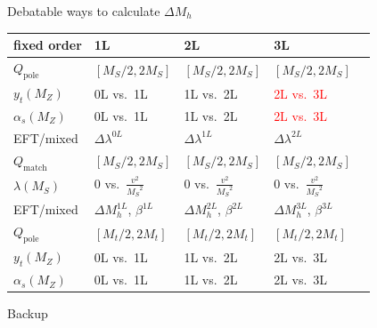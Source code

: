 \documentclass[hyperref={pdfpagelabels=false},ngerman]{beamer}
\newcommand{\MS}{\ensuremath{M_S}}
\newcommand{\pole}{\ensuremath{\text{pole}}}
\begin{document}
\begin{frame}{Debatable ways to calculate $\Delta M_h$}
  \begin{center}
  \begin{tabular}{lllll}
    \toprule
    fixed order & 1L & 2L & 3L \\
    \midrule
    $Q_\pole$ & $[\MS/2, 2\MS]$ & $[\MS/2, 2\MS]$ & $[\MS/2, 2\MS]$ \\
    $y_t(M_Z)$ & 0L vs.\ 1L & 1L vs.\ 2L & \textcolor{red}{2L vs.\ 3L} \\
    $\alpha_s(M_Z)$ & 0L vs.\ 1L & 1L vs.\ 2L & \textcolor{red}{2L vs.\ 3L} \\
    \midrule
    EFT/mixed & $\Delta\lambda^{0L}$ & $\Delta\lambda^{1L}$ & $\Delta\lambda^{2L}$ \\
    \midrule
    $Q_\text{match}$ & $[\MS/2, 2\MS]$ & $[\MS/2, 2\MS]$ & $[\MS/2, 2\MS]$ \\
    $\lambda(\MS)$ & $0$ vs.\ $\frac{v^2}{\MS^2}$ & $0$ vs.\ $\frac{v^2}{\MS^2}$ & $0$ vs.\ $\frac{v^2}{\MS^2}$ \\
    \midrule
    EFT/mixed & $\Delta M_h^{1L}$, $\beta^{1L}$ & $\Delta M_h^{2L}$, $\beta^{2L}$ & $\Delta M_h^{3L}$, $\beta^{3L}$ \\
    \midrule
    $Q_\pole$ & $[M_t/2, 2M_t]$ & $[M_t/2, 2M_t]$ & $[M_t/2, 2M_t]$ \\
    $y_t(M_Z)$ & 0L vs.\ 1L & 1L vs.\ 2L & 2L vs.\ 3L \\
    $\alpha_s(M_Z)$ & 0L vs.\ 1L & 1L vs.\ 2L & 2L vs.\ 3L \\
    \bottomrule
  \end{tabular}
\end{center}
\end{frame}


\begin{frame}[noframenumbering]
  \begin{center}
    \Huge Backup
  \end{center}
\end{frame}
\end{document}
